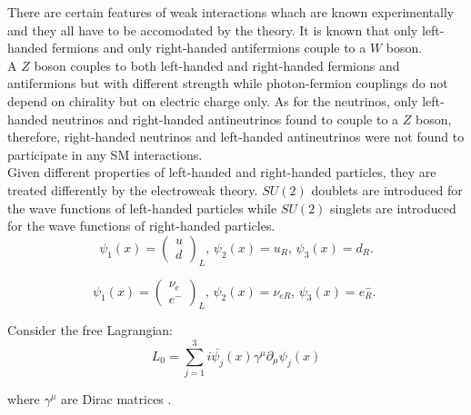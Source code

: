 There are certain features of weak interactions whach are known experimentally and they all have to be accomodated by the theory. It is known that only left-handed fermions and only right-handed antifermions couple to a $W$ boson.\\ 

A $Z$ boson couples to both left-handed and right-handed fermions and antifermions but with different strength while photon-fermion couplings do not depend on chirality but on electric charge only. As for the neutrinos, only left-handed neutrinos and right-handed antineutrinos found to couple to a $Z$ boson, therefore, right-handed neutrinos and left-handed antineutrinos were not found to participate in any SM interactions.\\

Given different properties of left-handed and right-handed particles, they are treated differently by the electroweak theory. $SU(2)$ doublets are introduced for the wave functions of left-handed particles while $SU(2)$ singlets are introduced for the wave functions of right-handed particles.\\ 
 

\begin{equation}\label{eq:psi_for_quarks}
\psi_1(x)=\begin{pmatrix} u \\ d \end{pmatrix}_L \text{, } \psi_2(x)=u_R \text{, } \psi_3(x)=d_R \text{.}
\end{equation}

\begin{equation}\label{eq:psi_for_leptons}
\psi_1(x)=\begin{pmatrix} \nu_e \\ e^- \end{pmatrix}_L \text{, } \psi_2(x)=\nu_{eR} \text{, } \psi_3(x)=e^-_R \text{. }
\end{equation}

Consider the free Lagrangian:\\

\begin{equation}\label{eq:L_free}
L_0 = \sum_{j=1}^{3} i \bar{\psi_j}(x) \gamma^\mu \partial_\mu \psi_j(x) 
\end{equation}

where $\gamma^\mu$ are Dirac matrices \cite{ref_Griffiths}.\\

